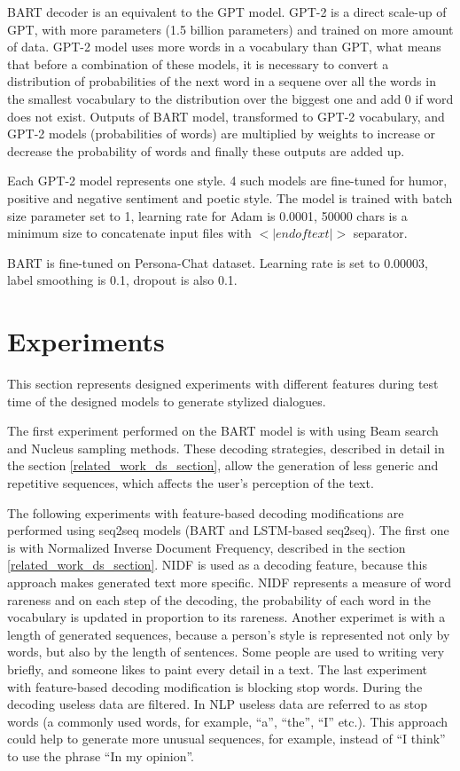 BART decoder is an equivalent to the GPT model. GPT-2 is a direct scale-up of GPT, with more parameters (1.5 billion parameters) and trained on more amount of data. GPT-2 model uses more words in a vocabulary than GPT, what means that before a combination of these models, it is necessary to convert a distribution of probabilities of the next word in a sequene over all the words in the smallest vocabulary to the distribution over the biggest one and add 0 if word does not exist. Outputs of BART model, transformed to GPT-2 vocabulary, and GPT-2 models (probabilities of words) are multiplied by weights to increase or decrease the probability of words and finally these outputs are added up.

Each GPT-2 model represents one style. 4 such models are fine-tuned for humor, positive and negative sentiment and poetic style. The model is trained with batch size parameter set to 1, learning rate for Adam is 0.0001, 50000 chars is a minimum size to concatenate input files with $<|endoftext|>$ separator. 

BART is fine-tuned on Persona-Chat dataset. Learning rate is set to 0.00003, label smoothing is 0.1, dropout is also 0.1.

\section{Experiments}
This section represents designed experiments with different features during test time of the designed models to generate stylized dialogues.

The first experiment performed on the BART model is with using Beam search and Nucleus sampling methods. These decoding strategies, described in detail in the section \ref{related_work_ds_section}, allow the generation of less generic and repetitive sequences, which affects the user's perception of the text.

The following experiments with feature-based decoding modifications are performed using seq2seq models (BART and LSTM-based seq2seq). The first one is with Normalized Inverse Document Frequency, described in the section \ref{related_work_ds_section}. NIDF is used as a decoding feature, because this approach makes generated text more specific. NIDF represents a measure of word rareness and on each step of the decoding, the probability of each word in the vocabulary is updated in proportion to its rareness. Another experimet is with a length of generated sequences, because a person's style is represented not only by words, but also by the length of sentences. Some people are used to writing very briefly, and someone likes to paint every detail in a text. The last experiment with feature-based decoding modification is blocking stop words. During the decoding useless data are filtered. In NLP useless data are referred to as stop words (a commonly used words, for example, ``a'', ``the'', ``I'' etc.). This approach could help to generate more unusual sequences, for example, instead of ``I think'' to use the phrase ``In my opinion''. 

